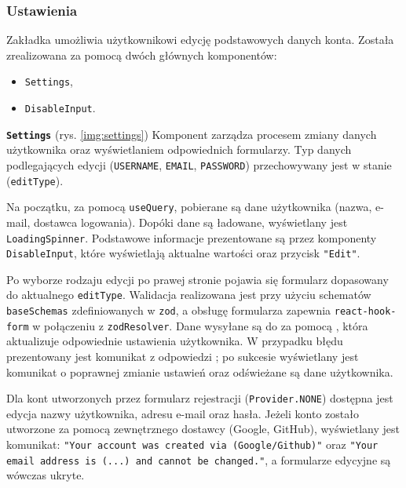 \subsubsection{Ustawienia}
\label{subsubsec:settings}

Zakładka umożliwia użytkownikowi edycję podstawowych danych konta.
Została zrealizowana za pomocą dwóch głównych komponentów:

\begin{itemize}
    \item \texttt{Settings},
    \item \texttt{DisableInput}.
\end{itemize}

\textbf{\texttt{Settings}}  (rys. \ref{img:settings})
Komponent zarządza procesem zmiany danych użytkownika oraz wyświetlaniem odpowiednich formularzy.
Typ danych podlegających edycji (\texttt{USERNAME}, \texttt{EMAIL}, \texttt{PASSWORD}) przechowywany jest w stanie (\texttt{editType}).

Na początku, za pomocą  \texttt{useQuery}, pobierane są dane użytkownika (nazwa, e-mail, dostawca logowania).
Dopóki dane są ładowane, wyświetlany jest \newline \texttt{LoadingSpinner}.
Podstawowe informacje prezentowane są przez komponenty \newline \texttt{DisableInput}, które wyświetlają aktualne wartości
oraz przycisk \texttt{"Edit"}.

Po wyborze rodzaju edycji po prawej stronie pojawia się formularz dopasowany do aktualnego \texttt{editType}.
Walidacja realizowana jest przy użyciu schematów \texttt{baseSchemas} zdefiniowanych w 
\texttt{zod}, a obsługę formularza zapewnia \texttt{react-hook-form} w połączeniu z \texttt{zodResolver}.
Dane wysyłane są do  za pomocą , która aktualizuje
odpowiednie ustawienia użytkownika.
W przypadku błędu prezentowany jest komunikat z odpowiedzi ; po sukcesie wyświetlany
jest komunikat o poprawnej zmianie ustawień oraz odświeżane są dane użytkownika.

Dla kont utworzonych przez formularz rejestracji (\texttt{Provider.NONE}) dostępna jest edycja nazwy użytkownika,
adresu e-mail oraz hasła.
Jeżeli konto zostało utworzone za pomocą zewnętrznego dostawcy (Google, GitHub), wyświetlany jest komunikat:
\texttt{"Your account was created via (Google/Github)"} oraz \newline
\texttt{"Your email address is (...) and cannot be changed."},
a formularze edycyjne są wówczas ukryte.

